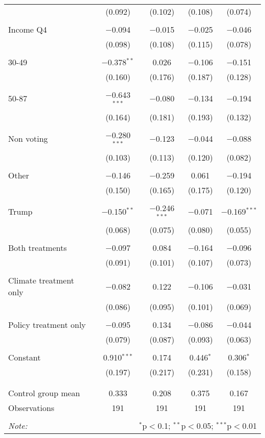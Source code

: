 \begin{tabular}{@{\extracolsep{5pt}}lcccc}
  & (0.092) & (0.102) & (0.108) & (0.074) \\ 
  & & & & \\ 
 Income Q4 & $-$0.094 & $-$0.015 & $-$0.025 & $-$0.046 \\ 
  & (0.098) & (0.108) & (0.115) & (0.078) \\ 
  & & & & \\ 
 30-49 & $-$0.378$^{**}$ & 0.026 & $-$0.106 & $-$0.151 \\ 
  & (0.160) & (0.176) & (0.187) & (0.128) \\ 
  & & & & \\ 
 50-87 & $-$0.643$^{***}$ & $-$0.080 & $-$0.134 & $-$0.194 \\ 
  & (0.164) & (0.181) & (0.193) & (0.132) \\ 
  & & & & \\ 
 Non voting & $-$0.280$^{***}$ & $-$0.123 & $-$0.044 & $-$0.088 \\ 
  & (0.103) & (0.113) & (0.120) & (0.082) \\ 
  & & & & \\ 
 Other & $-$0.146 & $-$0.259 & 0.061 & $-$0.194 \\ 
  & (0.150) & (0.165) & (0.175) & (0.120) \\ 
  & & & & \\ 
 Trump & $-$0.150$^{**}$ & $-$0.246$^{***}$ & $-$0.071 & $-$0.169$^{***}$ \\ 
  & (0.068) & (0.075) & (0.080) & (0.055) \\ 
  & & & & \\ 
 Both treatments & $-$0.097 & 0.084 & $-$0.164 & $-$0.096 \\ 
  & (0.091) & (0.101) & (0.107) & (0.073) \\ 
  & & & & \\ 
 Climate treatment only & $-$0.082 & 0.122 & $-$0.106 & $-$0.031 \\ 
  & (0.086) & (0.095) & (0.101) & (0.069) \\ 
  & & & & \\ 
 Policy treatment only & $-$0.095 & 0.134 & $-$0.086 & $-$0.044 \\ 
  & (0.079) & (0.087) & (0.093) & (0.063) \\ 
  & & & & \\ 
 Constant & 0.910$^{***}$ & 0.174 & 0.446$^{*}$ & 0.306$^{*}$ \\ 
  & (0.197) & (0.217) & (0.231) & (0.158) \\ 
  & & & & \\ 
\hline \\[-1.8ex] 
Control group mean & 0.333 & 0.208 & 0.375 & 0.167 \\ 
Observations & 191 & 191 & 191 & 191 \\ 
\hline 
\hline \\[-1.8ex] 
\textit{Note:}  & \multicolumn{4}{r}{$^{*}$p$<$0.1; $^{**}$p$<$0.05; $^{***}$p$<$0.01} \\ 
\end{tabular} 
